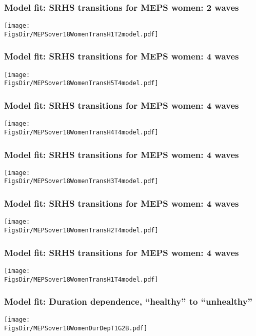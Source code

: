 \documentclass[aspectratio=169]{beamer}
\newcommand{\FigsDir}{../Figures}
\begin{document}
\begin{frame}\frametitle{Model fit: SRHS transitions for MEPS women: 2 waves}
\begin{center}
\texttt{[image: \\FigsDir/MEPSover18WomenTransH1T2model.pdf]}
\end{center}
\end{frame}

\begin{frame}\frametitle{Model fit: SRHS transitions for MEPS women: 4 waves}
\begin{center}
	\texttt{[image: \\FigsDir/MEPSover18WomenTransH5T4model.pdf]}
\end{center}
\end{frame}

\begin{frame}\frametitle{Model fit: SRHS transitions for MEPS women: 4 waves}
\begin{center}
\texttt{[image: \\FigsDir/MEPSover18WomenTransH4T4model.pdf]}
\end{center}
\end{frame}

\begin{frame}\frametitle{Model fit: SRHS transitions for MEPS women: 4 waves}
\begin{center}
\texttt{[image: \\FigsDir/MEPSover18WomenTransH3T4model.pdf]}
\end{center}
\end{frame}

\begin{frame}\frametitle{Model fit: SRHS transitions for MEPS women: 4 waves}
\begin{center}
\texttt{[image: \\FigsDir/MEPSover18WomenTransH2T4model.pdf]}
\end{center}
\end{frame}

\begin{frame}\frametitle{Model fit: SRHS transitions for MEPS women: 4 waves}
\begin{center}
\texttt{[image: \\FigsDir/MEPSover18WomenTransH1T4model.pdf]}
\end{center}
\end{frame}

\begin{frame}\frametitle{Model fit: Duration dependence, ``healthy'' to ``unhealthy''}
\begin{center}
	\texttt{[image: \\FigsDir/MEPSover18WomenDurDepT1G2B.pdf]}
\end{center}
\end{frame}
\end{document}
